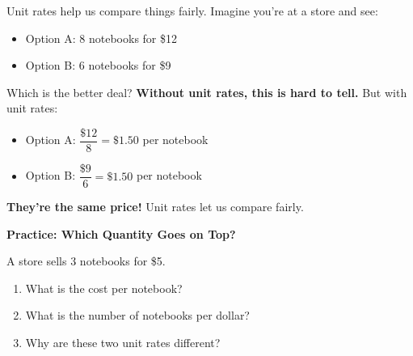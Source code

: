 \documentclass[12pt, letterpaper, fleqn]{article}
\begin{document}
\noindent
Unit rates help us compare things fairly. Imagine you're at a store and see:

\begin{itemize}
    \item Option A: 8 notebooks for \$12
    \item Option B: 6 notebooks for \$9
\end{itemize}

\noindent
Which is the better deal? \textbf{Without unit rates, this is hard to tell.} But with unit rates:

\begin{itemize}
    \item Option A: $\dfrac{\$12}{8} = \$1.50$ per notebook
    \item Option B: $\dfrac{\$9}{6} = \$1.50$ per notebook
\end{itemize}

\noindent
\textbf{They're the same price!} Unit rates let us compare fairly.

\vspace{4mm}

\begin{tcolorbox}[colback=white!15,colframe=black,boxrule=1.5pt,arc=4mm,left=6mm,right=6mm,top=5mm,bottom=5mm]

\textbf{Practice: Which Quantity Goes on Top?}

\medskip

A store sells 3 notebooks for \$5.

\begin{enumerate}
\item What is the cost per notebook?

\vspace{2cm}

\item What is the number of notebooks per dollar?

\vspace{2cm}

\item Why are these two unit rates different?

\vspace{2cm}

\end{enumerate}

\end{tcolorbox}

\newpage
\end{document}

